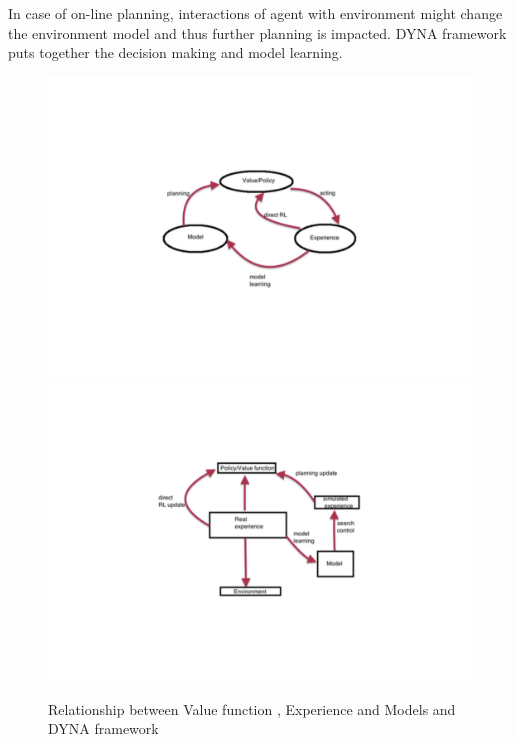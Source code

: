 \documentclass[MTech]{iitmdiss}
\begin{document}
In case of on-line planning, interactions of agent with environment might change the environment model and thus further planning is impacted. DYNA framework \cite{dyna92} puts together the decision making and model learning.
\begin{figure}[htpb]
   \begin{center}
     \resizebox{75mm}{75mm} {\includegraphics {dyna1}}
     \resizebox{75mm}{75mm} {\includegraphics {dyna2}}
     \caption {Relationship between Value function , Experience and Models and DYNA framework}
   \label{fig:dyna}
   \end{center}
 \end{figure}
 
\end{document}
